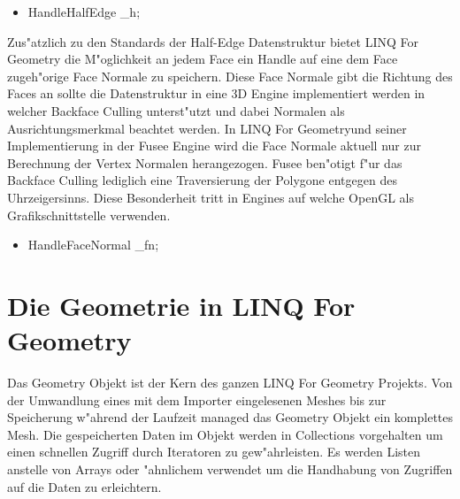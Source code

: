 \documentclass[pagesize, paper=a4, fontsize=12pt,titlepage=true, headings=small, headnosepline, abstractoff, liststotoc, nochapterprefix, plainheadsepline]{scrreprt}
\newcommand{\LFG}{LINQ For Geometry}
\newcommand{\LFGS}{LINQ For Geometry }
\newcommand{\HES}{Half-Edge Datenstruktur }
\begin{document}
\begin{itemize}
\item HandleHalfEdge \_h;
\end{itemize}

Zus"atzlich zu den Standards der \HES bietet \LFGS die M"oglichkeit an jedem Face ein Handle auf eine dem Face zugeh"orige Face Normale zu speichern. Diese Face Normale gibt die Richtung des Faces an sollte die Datenstruktur in eine 3D Engine implementiert werden in welcher Backface Culling unterst"utzt und dabei Normalen als Ausrichtungsmerkmal beachtet werden. In \LFG und seiner Implementierung in der Fusee Engine wird die Face Normale aktuell nur zur Berechnung der Vertex Normalen herangezogen. Fusee ben"otigt f"ur das Backface Culling lediglich eine Traversierung der Polygone entgegen des Uhrzeigersinns. Diese Besonderheit tritt in Engines auf welche OpenGL als Grafikschnittstelle verwenden.
\begin{itemize}
\item HandleFaceNormal \_fn;
\end{itemize}
	\section {Die Geometrie in \LFG}
			Das Geometry Objekt ist der Kern des ganzen \LFGS Projekts. Von der Umwandlung eines mit dem Importer eingelesenen Meshes bis zur Speicherung w"ahrend der Laufzeit managed das Geometry Objekt ein komplettes Mesh. Die gespeicherten Daten im Objekt werden in Collections vorgehalten um einen schnellen Zugriff durch Iteratoren zu gew"ahrleisten. Es werden Listen anstelle von Arrays oder "ahnlichem verwendet um die Handhabung von Zugriffen auf die Daten zu erleichtern.
\end{document}
